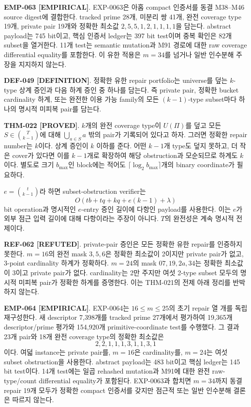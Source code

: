 \documentclass[11pt]{article}
\newcommand{\claimstatus}[2]{\textbf{#1 [#2]}}
\begin{document}
\claimstatus{EMP-063}{EMPIRICAL}.
EXP-0063은 아홉 compact 인증서를 동결 M38--M46 source digest에
결합한다. tracked prime 28개, 미분리 쌍 41개, 완전 coverage type
19개, private pair 19개와 정확한 최소값
\(2,5,5,1,2,1,1,1,1\)을 담는다. abstract payload는 745 bit이고,
핵심 인증서 ledger는 397 bit test이며 중복 확인은 82개 subset을
열거한다. 11개 test는 semantic mutation과 M91 경로에 대한 raw
coverage differential equality를 포함한다. 이 유한 적용은
\(m=34\)를 넘거나 일반 인수분해 주장을 지지하지 않는다.

\claimstatus{DEF-049}{DEFINITION}.
정확한 유한 repair portfolio는 universe를 덮는 \(k\)-type 상계 증인과
다음 하계 증인 중 하나를 담는다. 즉 private pair, 정확한 bucket
cardinality 하계, 또는 완전한 이용 가능 family의 모든
\((k-1)\)-type subset마다 하나의 명시적 미피복 pair를 담는다.

\claimstatus{THM-022}{PROVED}.
\(k\)개의 완전 coverage type이 \(U(\Pi)\)를 덮고 모든
\(S\in\binom{T}{k-1}\)에 대해 \(\bigcup_{a\in S}a\) 밖의 pair가
기록되어 있다고 하자. 그러면 정확한 repair number는 \(k\)이다. 상계
증인이 \(k\) 이하를 준다. 어떤 \(k-1\)개 type도 덮지 못하고, 더 작은
cover가 있다면 이를 \(k-1\)개로 확장하여 해당 obstruction과 모순되므로
하계도 \(k\)이다. 별도로 크기 \(b_{\max}\)인 block에는 적어도
\(\lceil\log_2b_{\max}\rceil\)개의 binary coordinate가 필요하다.

\(e=\binom{t}{k-1}\)라 하면 subset-obstruction verifier는
\[
 O(tb+tq+kq+e(k-1)+\lambda)
\]
bit operation과 명시적인 \(e\)-entry 증인 길이에 다항인 payload를
사용한다. 이는 \(e\)가 외부 점근 입력 길이에 대해 다항이라는 주장이
아니다. \(T\)의 완전성은 계속 명시적 전제이다.

\claimstatus{REF-062}{REFUTED}.
private-pair 증인은 모든 정확한 유한 repair를 인증하지 못한다.
\(m=16\)의 완전 mask \(3,5,6\)은 정확한 최소값이 2이지만 private
pair가 없고, 3-point cardinality 하계가 정확하다. \(m=24\)의 mask
\(07,19,2a,34\)는 정확한 최소값이 3이고 private pair가 없다.
cardinality는 2만 주지만 여섯 2-type subset 모두의 명시적 미피복
pair가 정확한 하계를 증명한다. 이는 THM-021의 전제 아래 정리를
반박하지 않는다.

\claimstatus{EMP-064}{EMPIRICAL}.
EXP-0064는 \(16\le m\le25\)의 초기 repair 열 개를 독립 재구성한다.
새 descriptor 7,398개를 tracked prime 27개에서 평가하여 19,365개
descriptor/prime 평가와 154,920개 primitive-coordinate test를
수행했다. 그 결과 23개 pair와 18개 완전 coverage type의 정확한
최소값은
\[
 2,2,1,1,1,3,1,1,3,1
\]
이다. 여덟 instance는 private pair를, \(m=16\)은 cardinality를,
\(m=24\)는 여섯 subset obstruction을 사용한다. abstract payload는
483 bit이고 핵심 ledger는 145 bit test이다. 14개 test에는 일곱
rehashed mutation과 M91에 대한 완전 raw-type/count differential
equality가 포함된다. EXP-0063과 합치면 \(m=34\)까지 동결 repair
19개 모두가 정확한 compact 인증서를 갖지만 점근적 또는 일반
인수분해 결론은 따르지 않는다.
\end{document}
